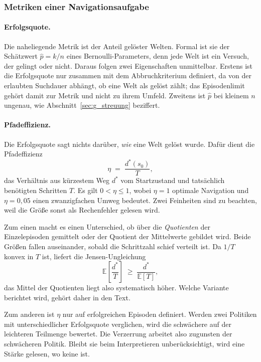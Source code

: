 \documentclass[11pt,a4paper]{article}
\begin{document}
\subsubsection{Metriken einer Navigationsaufgabe}
\label{sec:g_metriken}

\paragraph{Erfolgsquote.}
Die naheliegende Metrik ist der Anteil gelöster Welten. Formal ist sie der
Schätzwert $\hat p = k/n$ eines Bernoulli-Parameters, denn jede Welt ist ein
Versuch, der gelingt oder nicht. Daraus folgen zwei Eigenschaften unmittelbar.
Erstens ist die Erfolgsquote nur zusammen mit dem Abbruchkriterium definiert,
da von der erlaubten Suchdauer abhängt, ob eine Welt als gelöst zählt; das
Episodenlimit gehört damit zur Metrik und nicht zu ihrem Umfeld. Zweitens ist
$\hat p$ bei kleinem $n$ ungenau, wie Abschnitt~\ref{sec:g_streuung} beziffert.

\paragraph{Pfadeffizienz.}
Die Erfolgsquote sagt nichts darüber, \emph{wie} eine Welt gelöst wurde. Dafür
dient die Pfadeffizienz
\begin{equation}
\eta \;=\; \frac{d^{*}(s_0)}{T},
\end{equation}
das Verhältnis aus kürzestem Weg $d^{*}$ vom Startzustand und tatsächlich
benötigten Schritten $T$. Es gilt $0 < \eta \leq 1$, wobei $\eta = 1$ optimale
Navigation und $\eta = 0{,}05$ einen zwanzigfachen Umweg bedeutet. Zwei
Feinheiten sind zu beachten, weil die Größe sonst als Rechenfehler gelesen
wird.

Zum einen macht es einen Unterschied, ob über die \emph{Quotienten} der
Einzelepisoden gemittelt oder der Quotient der Mittelwerte gebildet wird. Beide
Größen fallen auseinander, sobald die Schrittzahl schief verteilt ist. Da
$1/T$ konvex in $T$ ist, liefert die Jensen-Ungleichung
\begin{equation}
\mathbb{E}\!\left[\frac{d^{*}}{T}\right] \;\geq\; \frac{d^{*}}{\mathbb{E}[T]},
\end{equation}
das Mittel der Quotienten liegt also systematisch höher. Welche Variante
berichtet wird, gehört daher in den Text.

Zum anderen ist $\eta$ nur auf erfolgreichen Episoden definiert. Werden zwei
Politiken mit unterschiedlicher Erfolgsquote verglichen, wird die schwächere auf
der leichteren Teilmenge bewertet. Die Verzerrung arbeitet also zugunsten der
schwächeren Politik. Bleibt sie beim Interpretieren unberücksichtigt, wird eine
Stärke gelesen, wo keine ist.
\end{document}
